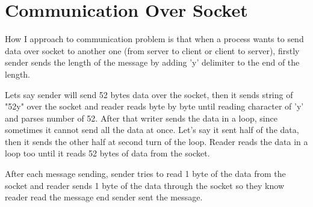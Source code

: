 \documentclass{article}
\begin{document}
{\parindent}\section{Communication Over Socket}
\par\hspace{\parindent} How I approach to communication problem is that when a process wants to send data over socket to another one (from server to client or client to server), firstly sender sends the length of the message by adding 'y' delimiter to the end of the length. 
\par Lets say sender will send 52 bytes data over the socket, then it sends string of "52y" over the socket and reader reads byte by byte until reading character of 'y' and parses number of 52. After that writer sends the data in a loop, since sometimes it cannot send all the data at once. Let's say it sent half of the data, then it sends the other half at second turn of the loop. Reader reads the data in a loop too until it reads 52 bytes of data from the socket. 
\par After each message sending, sender tries to read 1 byte of the data from the socket and reader sends 1 byte of the data through the socket so they know reader read the message end sender sent the message.
\end{document}
